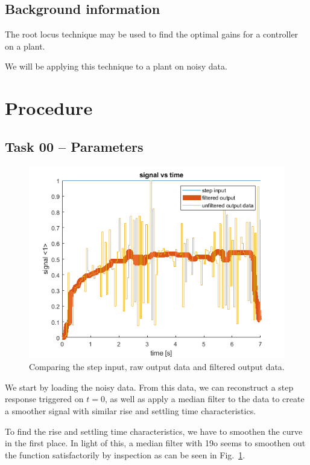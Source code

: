 \documentclass[12pt]{article}
\begin{document}
\subsection{Background information}\label{ssc:background}

The root locus technique may be used to find the optimal gains for a controller on a plant.

We will be applying this technique to a plant on noisy data.

\section{Procedure}\label{sec:Procedure}

\subsection{Task 00 -- Parameters}\label{ssc:parameters}

\begin{figure}
    \centering
    \includegraphics[width=\linewidth]{img/task01_viewing_data.png}
    \caption{Comparing the step input, raw output data and filtered output data.}
    \label{fig:viewing data}
\end{figure}

We start by loading the noisy data. From this data, we can reconstruct a step response triggered on $t = 0$, as well as apply a median filter to the data to create a smoother signal with similar rise and settling time characteristics.

To find the rise and settling time characteristics, we have
to smoothen the curve in the first place.  In light of this, a median
filter with 19o seems to smoothen out the function satisfactorily by
inspection
as can be seen in Fig.~\ref{fig:viewing data}.
\end{document}
